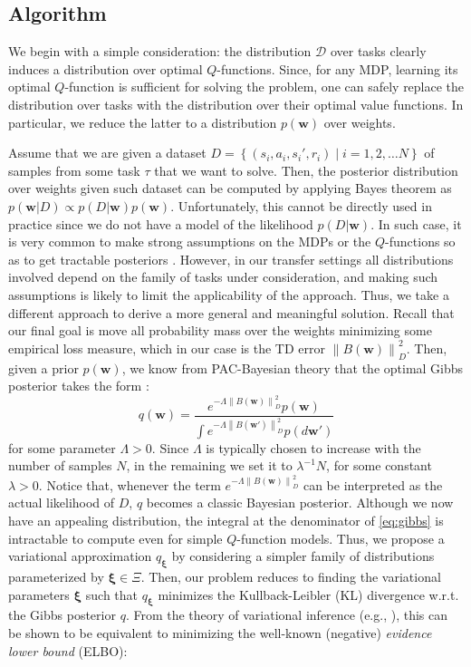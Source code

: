 \documentclass{article}
\newcommand{\norm}[1]{\left\lVert #1 \right\rVert}
\begin{document}
\subsection{Algorithm}\label{sec:alg}

We begin with a simple consideration: the distribution $\mathcal{D}$ over tasks clearly induces a distribution over optimal $Q$-functions. Since, for any MDP, learning its optimal $Q$-function is sufficient for solving the problem, one can safely replace the distribution over tasks with the distribution over their optimal value functions. In particular, we reduce the latter to a distribution $p(\bm{w})$ over weights.
 
Assume that we are given a dataset $D=\left\{(s_i,a_i,s_i',r_i) \mid i = 1,2,\dots N\right\}$ of samples from some task $\tau$ that we want to solve. Then, the posterior distribution over weights given such dataset can be computed by applying Bayes theorem as $p(\bm{w} | D) \propto p(D | \bm{w})p(\bm{w})$. Unfortunately, this cannot be directly used in practice since we do not have a model of the likelihood $p(D|\bm{w})$. In such case, it is very common to make strong assumptions on the MDPs or the $Q$-functions so as to get tractable posteriors \cite{}. However, in our transfer settings all distributions involved depend on the family of tasks under consideration, and making such assumptions is likely to limit the applicability of the approach. Thus, we take a different approach to derive a more general and meaningful solution. Recall that our final goal is move all probability mass over the weights minimizing some empirical loss measure, which in our case is the TD error $\norm{B(\bm{w})}_D^2$. Then, given a prior $p(\bm{w})$, we know from PAC-Bayesian theory that the optimal Gibbs posterior takes the form \cite{}:
\begin{equation}\label{eq:gibbs}
q(\bm{w}) = \frac{e^{-\Lambda\norm{B(\bm{w})}_D^2}p(\bm{w})}{\int e^{-\Lambda\norm{B(\bm{w}')}_D^2}p(d\bm{w}')}
\end{equation}
for some parameter $\Lambda > 0$. Since $\Lambda$ is typically chosen to increase with the number of samples $N$, in the remaining we set it to $\lambda^{-1}N$, for some constant $\lambda > 0$. Notice that, whenever the term $e^{-\Lambda\norm{B(\bm{w})}_D^2}$ can be interpreted as the actual likelihood of $D$, $q$ becomes a classic Bayesian posterior. Although we now have an appealing distribution, the integral at the denominator of \eqref{eq:gibbs} is intractable to compute even for simple $Q$-function models. Thus, we propose a variational approximation $q_{\bm{\xi}}$ by considering a simpler family of distributions parameterized by $\bm{\xi} \in \Xi$. Then, our problem reduces to finding the variational parameters $\bm{\xi}$ such that $q_{\bm{\xi}}$ minimizes the Kullback-Leibler (KL) divergence w.r.t. the Gibbs posterior $q$. From the theory of variational inference (e.g., \cite{}), this can be shown to be equivalent to minimizing the well-known (negative) \textit{evidence lower bound} (ELBO):
\end{document}
